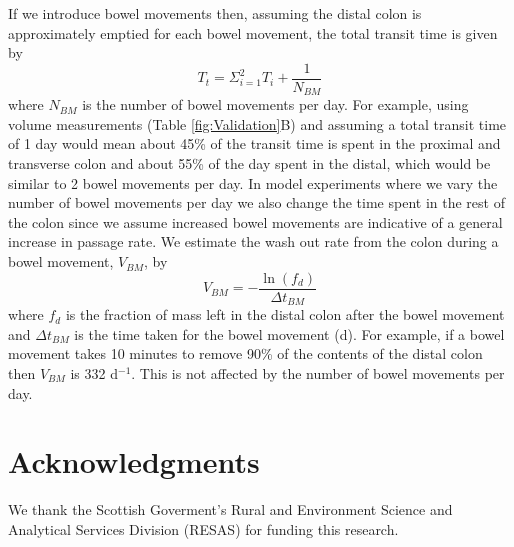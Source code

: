 \documentclass[a4paper]{article}
\begin{document}
If we introduce bowel movements then, assuming the distal colon is approximately emptied for each bowel movement, the total transit time is given by 
\begin{equation}
    T_t=\Sigma_{i=1}^2T_i + \frac{1}{N_{BM}}
\end{equation}
where $N_{BM}$ is the number of bowel movements per day.
For example, using volume measurements (Table \ref{fig:Validation}B) and assuming a total transit time of 1 day would mean about 45\% of the transit time is spent in the proximal and transverse colon and about 55\% of the day spent in the distal, which would be similar to 2 bowel movements per day. 
In model experiments where we vary the number of bowel movements per day we also change the time spent in the rest of the colon since we assume increased bowel movements are indicative of a general increase in passage rate.
We estimate the wash out rate from the colon during a bowel movement, $V_{BM}$, by
\begin{equation}
    V_{BM}=-\frac{\ln(f_d)}{\Delta t_{BM}}
\end{equation}
where $f_d$ is the fraction of mass left in the distal colon after the bowel movement and $\Delta t_{BM}$ is the time taken for the bowel movement (d). For example, if a bowel movement takes 10 minutes to remove 90\% of the contents of the distal colon then $V_{BM}$ is 332  d$^{-1}$. This is not affected by the number of bowel movements per day.

\section*{Acknowledgments}
We thank the Scottish Goverment's Rural and Environment Science and Analytical Services Division (RESAS) for funding this research. 


\end{document}
